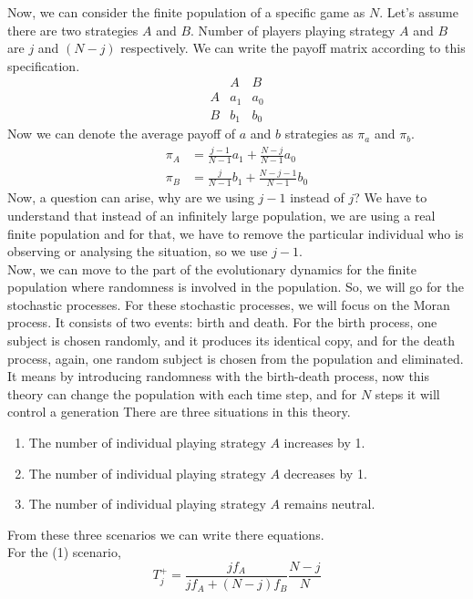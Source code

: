 \documentclass{article}
\begin{document}
Now, we can consider the finite population of a specific game as $N$.
Let's assume there are two strategies $A$ and $B$. Number of players playing strategy $A$ and $B$ are $j$ and $(N-j)$ respectively.
We can write the payoff matrix according to this specification.
\[
\begin{array}{c|cc}
    & A & B \\
    \hline
  A & a_1 & a_0 \\
  B & b_1 & b_0
\end{array}
\]
Now we can denote the average payoff of $a$ and $b$ strategies as $\pi_a$ and $\pi_b$.
\begin{align}
\pi_A&=\frac{j-1}{N-1}a_1 + \frac{N-j}{N-1}a_0 \nonumber\\
\pi_B&=\frac {j}{N-1}b_1 + \frac{N-j-1}{N-1}b_0\label{eq:12}
\end{align}
Now, a question can arise, why are we using $j-1$ instead of $j$? We have to understand that instead of an infinitely large population, we are using a real finite population and for that, we have to remove the particular individual who is observing or analysing the situation, so we use $j-1$.\\
Now, we can move to the part of the evolutionary dynamics for the finite population where randomness is involved in the population.
So, we will go for the stochastic processes.
For these stochastic processes, we will focus on the Moran process. It consists of two events: birth and death. 
For the birth process, one subject is chosen randomly, and it produces its identical copy, and for the death process, again, one random subject is chosen from the population and eliminated. 
It means by introducing randomness with the birth-death process, now this theory can change the population with each time step, and for $N$ steps it will control a generation \cite{Moran1962}
There are three situations in this theory.
\begin{enumerate}
\item The number of individual playing strategy $A$ increases by 1.
\item The number of individual playing strategy $A$ decreases by 1.
\item The number of individual playing strategy $A$ remains neutral.
\end{enumerate}
From these three scenarios we can write there equations.\\
For the (1) scenario,
\begin{equation}
T_j^+=\frac{jf_A}{jf_A+(N-j)f_B}\frac{N-j}{N} \label{eq:13}
\end{equation}
\end{document}

